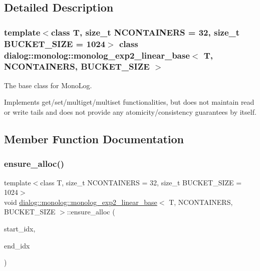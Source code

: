 \subsection{Detailed Description}
\subsubsection*{template$<$class T, size\+\_\+t N\+C\+O\+N\+T\+A\+I\+N\+E\+RS = 32, size\+\_\+t B\+U\+C\+K\+E\+T\+\_\+\+S\+I\+ZE = 1024$>$\newline
class dialog\+::monolog\+::monolog\+\_\+exp2\+\_\+linear\+\_\+base$<$ T, N\+C\+O\+N\+T\+A\+I\+N\+E\+R\+S, B\+U\+C\+K\+E\+T\+\_\+\+S\+I\+Z\+E $>$}

The base class for Mono\+Log.

Implements get/set/multiget/multiset functionalities, but does not maintain read or write tails and does not provide any atomicity/consistency guarantees by itself. 

\subsection{Member Function Documentation}
\mbox{\label{classdialog_1_1monolog_1_1monolog__exp2__linear__base_a6daa5a4785866597eecfcdae2e333d0e}} 
\subsubsection{\texorpdfstring{ensure\+\_\+alloc()}{ensure\_alloc()}}
{\footnotesize\ttfamily template$<$class T, size\+\_\+t N\+C\+O\+N\+T\+A\+I\+N\+E\+RS = 32, size\+\_\+t B\+U\+C\+K\+E\+T\+\_\+\+S\+I\+ZE = 1024$>$ \\
void \hyperlink{classdialog_1_1monolog_1_1monolog__exp2__linear__base}{dialog\+::monolog\+::monolog\+\_\+exp2\+\_\+linear\+\_\+base}$<$ T, N\+C\+O\+N\+T\+A\+I\+N\+E\+RS, B\+U\+C\+K\+E\+T\+\_\+\+S\+I\+ZE $>$\+::ensure\+\_\+alloc (\begin{DoxyParamCaption}\item[{size\+\_\+t}]{start\+\_\+idx,  }\item[{size\+\_\+t}]{end\+\_\+idx }\end{DoxyParamCaption})\hspace{0.3cm}{\ttfamily [inline]}}

